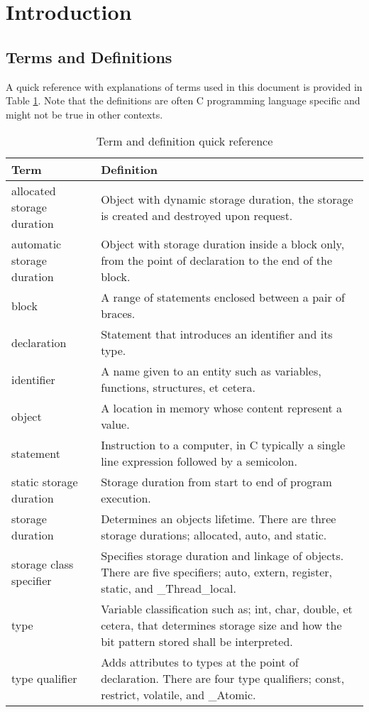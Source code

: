 \documentclass{article}
\begin{document}
\section{Introduction}

\subsection{Terms and Definitions}

A quick reference with explanations of terms used in this document is provided in Table \ref{tab:terms-and-defs}. Note that the definitions are often C programming language specific and might not be true in other contexts.

\begin{table}[h]
\begin{tabularx}{\textwidth}{lX}
\toprule
Term & Definition \\
\midrule
allocated storage duration & Object with dynamic storage duration, the storage is created and destroyed upon request. \\
automatic	storage duration &	Object with storage duration inside a block only, from the point of declaration to the end of the block. \\
block & A range of statements enclosed between a pair of braces. \\
declaration & Statement that introduces an identifier and its type. \\
identifier & A name given to an entity such as variables, functions, structures, et cetera. \\
object & A location in memory whose content represent a value. \\
statement & Instruction to a computer, in C typically a single line expression followed by a semicolon. \\
static storage duration & Storage duration from start to end of program execution. \\
storage duration & Determines an objects lifetime. There are three storage durations; allocated, auto, and static. \\
storage class specifier & Specifies storage duration and linkage of objects. There are five specifiers; auto, extern, register, static, and \_Thread\_local. \\
type & Variable classification such as; int, char, double, et cetera, that determines storage size and how the bit pattern stored shall be interpreted.\\
type qualifier & Adds attributes to types at the point of declaration. There are four type qualifiers; const, restrict, volatile, and \_Atomic. \\
\bottomrule
\end{tabularx}
\caption{Term and definition quick reference}
\label{tab:terms-and-defs}
\end{table}
\end{document}
